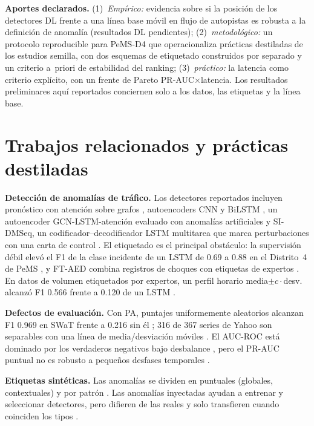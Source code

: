 \documentclass[conference]{IEEEtran}
\begin{document}
\textbf{Aportes declarados.} (1)~\emph{Emp\'irico:} evidencia sobre si la
posici\'on de los detectores DL frente a una l\'inea base m\'ovil en flujo de
autopistas es robusta a la definici\'on de anomal\'ia (resultados DL
pendientes); (2)~\emph{metodol\'ogico:} un protocolo reproducible para PeMS-D4
que operacionaliza pr\'acticas destiladas de los estudios semilla, con dos
esquemas de etiquetado construidos por separado y un criterio a~priori de
estabilidad del ranking; (3)~\emph{pr\'actico:} la latencia como criterio
expl\'icito, con un frente de Pareto PR-AUC$\times$latencia. Los resultados
preliminares aqu\'i reportados conciernen solo a los datos, las etiquetas y la
l\'inea base.

\section{Trabajos relacionados y pr\'acticas destiladas}

\textbf{Detecci\'on de anomal\'ias de tr\'afico.} Los detectores reportados
incluyen pron\'ostico con atenci\'on sobre grafos \cite{zhang2022automatic},
autoencoders CNN y BiLSTM \cite{mendez2022using}, un autoencoder
GCN-LSTM-atenci\'on evaluado con anomal\'ias artificiales
\cite{ijaradar2025datadriven} y SI-DMSeq, un codificador--decodificador LSTM
multitarea que marca perturbaciones con una carta de control
\cite{nouri2025sidmseq}. El etiquetado es el principal obst\'aculo: la
supervisi\'on d\'ebil elev\'o el F1 de la clase incidente de un LSTM de 0.69 a
0.88 en el Distrito~4 de PeMS \cite{sun2022datacentric}, y FT-AED combina
registros de choques con etiquetas de expertos \cite{coursey2024ftaed}. En
datos de volumen etiquetados por expertos, un perfil horario
media$\pm c\cdot$desv. alcanz\'o F1 0.566 frente a 0.120 de un LSTM
\cite{taheri2026applicability}.

\textbf{Defectos de evaluaci\'on.} Con PA, puntajes uniformemente aleatorios
alcanzan F1 0.969 en SWaT frente a 0.216 sin \'el \cite{kim2022rigorous}; 316
de 367 series de Yahoo son separables con una l\'inea de media/desviaci\'on
m\'oviles \cite{wu2022flawed}. El AUC-ROC est\'a dominado por los verdaderos
negativos bajo desbalance \cite{sorbo2024navigating,liu2024elephant}, pero el
PR-AUC puntual no es robusto a peque\~nos desfases temporales
\cite{liu2024elephant}.

\textbf{Etiquetas sint\'eticas.} Las anomal\'ias se dividen en puntuales
(globales, contextuales) y por patr\'on \cite{lai2021revisiting}. Las anomal\'ias
inyectadas ayudan a entrenar y seleccionar detectores, pero difieren de las
reales y solo transfieren cuando coinciden los tipos
\cite{carmona2022ncad,goswami2023unsupervised}.
\end{document}
